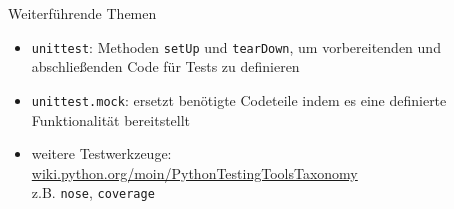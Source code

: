 \documentclass[t, utf8x, 10pt]{beamer}
\begin{document}
\begin{frame}{Weiterführende Themen}
 \begin{itemize}
  \item \texttt{unittest}: Methoden \texttt{setUp} und \texttt{tearDown}, um
	vorbereitenden und abschließenden Code für Tests zu definieren
  \item \texttt{unittest.mock}: ersetzt benötigte Codeteile indem es eine
	definierte Funktionalität bereitstellt
  \item weitere Testwerkzeuge:\\
	\url{wiki.python.org/moin/PythonTestingToolsTaxonomy}\\
	z.B. \texttt{nose}, \texttt{coverage}
 \end{itemize}
\end{frame}
\end{document}
